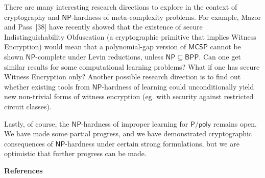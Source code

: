 \documentclass[10pt,a4paper]{article}
\begin{document}
There are many interesting research directions to explore in the context of cryptography and ${\mathsf{NP}}$-hardness of meta-complexity problems. For example,
Mazor and Pass [38] have recently showed that the existence of secure Indistinguishability Obfuscation (a cryptographic primitive that implies Witness Encryption) would mean that a polynomial-gap version of ${\mathsf{MCSP}}$ cannot be shown ${\mathsf{NP}}$-complete under Levin reductions, unless ${\mathsf{NP}}\subseteq{\mathsf{BPP}}$. Can one get similar results for some computational learning problems? What if one has secure Witness Encryption only? Another possible research direction is to find out whether existing tools from ${\mathsf{NP}}$-hardness of learning could unconditionally yield new non-trivial forms of witness encryption (eg. with security against restricted circuit classes).\par




Lastly, of course, the ${\mathsf{NP}}$-hardness of improper learning for ${\mathsf{P}}/{\mathsf{poly}}$ remains open. We have made some partial progress, and we have demonstrated cryptographic consequences of ${\mathsf{NP}}$-hardness under certain strong formulations, but we are optimistic that further progress can be made.\par





\par\medskip\noindent\textbf{References}\par
\end{document}
